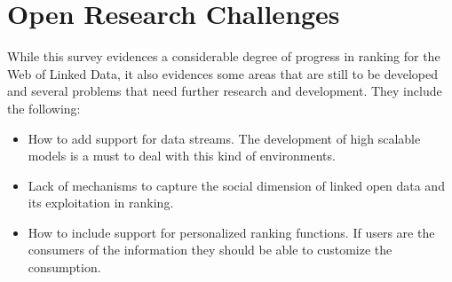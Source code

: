 \section{Open Research Challenges}\label{sec:challenges}

While this survey evidences a considerable degree of progress in ranking for the Web of Linked Data, it also evidences some areas that are still to be developed and several problems that need further research and development. They include the following:
\begin{itemize}
	\item How to add support for data streams. The development of high scalable models is a must to deal with this kind of environments.
	\item Lack of mechanisms to capture the social dimension of linked open data and its exploitation in ranking.
	\item How to include support for personalized ranking functions. If users are the consumers of the information they should be able to customize the consumption.	
\end{itemize}

